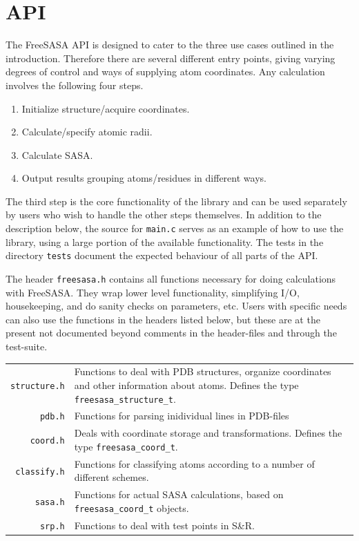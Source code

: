 \documentclass[a4paper,11pt]{article}
\begin{document}
\section{API} \label{sec:using}

The FreeSASA API is designed to cater to the three use cases outlined
in the introduction. Therefore there are several different entry
points, giving varying degrees of control and ways of supplying atom
coordinates. Any calculation involves the following four steps.
\begin{enumerate}
  \item Initialize structure/acquire coordinates.
  \item Calculate/specify atomic radii.
  \item Calculate SASA.
  \item Output results grouping atoms/residues in different ways.
\end{enumerate}
The third step is the core functionality of the library and can be
used separately by users who wish to handle the other steps
themselves. In addition to the description below, the source for
\texttt{main.c} serves as an example of how to use the library,
using a large portion of the available functionality. The tests in the
directory \verb|tests| document the expected behaviour of all parts of
the API.

The header \texttt{freesasa.h} contains all functions necessary for
doing calculations with FreeSASA. They wrap lower level functionality,
simplifying I/O, housekeeping, and do sanity checks on parameters,
etc. Users with specific needs can also use the functions in the
headers listed below, but these are at the present not documented
beyond comments in the header-files and through the test-suite.

\begin{tabular}{r>{\raggedright\arraybackslash}p{}}
\texttt{structure.h} & Functions to deal with PDB structures,  
                       organize coordinates and other information
                       about atoms. Defines the type 
                       \verb|freesasa_structure_t|.\\
\texttt{pdb.h} & Functions for parsing inidividual lines in PDB-files \\
\texttt{coord.h} & Deals with coordinate storage and transformations. Defines
                   the type \verb|freesasa_coord_t|.\\
\texttt{classify.h} & Functions for classifying atoms according
                      to a number of different schemes.\\
\texttt{sasa.h} & Functions for actual SASA calculations, based on
                  \verb|freesasa_coord_t| objects.\\
\texttt{srp.h} & Functions to deal with test points in S\&R. \\
\end{tabular}
\end{document}
